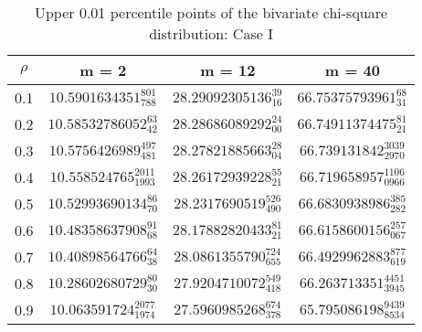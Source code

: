 \newdimen\captionwidth \captionwidth=4.5in
\begin{table}[ht]
\caption{Upper 0.01 percentile points of the bivariate chi-square distribution:
Case I}
\label{case1:01}
\begin{center}
\begin{tabular}{c|c|c|c}
$\rho$ & m = 2 & m = 12 & m = 40 \\ \hline
0.1  & $ 10.5901634351_{788}^{801} $ & $ 28.29092305136_{16}^{39}  $ & $ 66.75375793961_{31}^{68} $ \\
0.2  & $ 10.58532786052_{42}^{63} $ & $ 28.28686089292_{00}^{24}  $ & $ 66.74911374475_{21}^{81} $ \\
0.3  & $ 10.5756426989_{481}^{497} $ & $ 28.27821885663_{04}^{28}  $ & $ 66.739131842_{2970}^{3039} $ \\
0.4  & $ 10.558524765_{1993}^{2011} $ & $ 28.26172939228_{21}^{55}  $ & $ 66.719658957_{0966}^{1106} $ \\
0.5  & $ 10.52993690134_{70}^{86} $ & $ 28.2317690519_{490}^{526} $ & $ 66.6830938986_{282}^{385} $ \\
0.6  & $ 10.48358637908_{68}^{91} $ & $ 28.17882820433_{21}^{81}  $ & $ 66.6158600156_{067}^{257} $ \\
0.7  & $ 10.40898564766_{38}^{64} $ & $ 28.0861355790_{655}^{724} $ & $ 66.4929962883_{619}^{877} $ \\
0.8  & $ 10.28602680729_{30}^{80} $ & $ 27.9204710072_{418}^{549} $ & $ 66.263713351_{3945}^{4451} $ \\
0.9  & $ 10.063591724_{1974}^{2077} $ & $ 27.5960985268_{378}^{674} $ & $ 65.795086198_{8534}^{9439} $ \\
\end{tabular}
\end{center}
\end{table}

